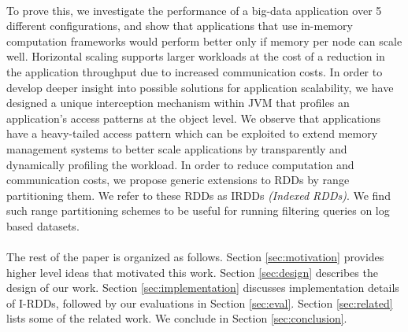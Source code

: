 \paragraph{}
To prove this, we investigate the performance of a big-data application
over 5 different configurations, and show that applications that use
in-memory computation frameworks would perform better only if memory per
node can scale well. Horizontal scaling supports larger workloads at the
cost of a reduction in the application throughput due to increased
communication costs. In order to develop deeper insight into possible
solutions for application scalability, we have designed a unique
interception mechanism within JVM that profiles an application's
access patterns at the object level. We observe that applications have a
heavy-tailed access pattern which can be exploited to extend memory
management systems to better scale applications by transparently and
dynamically profiling the workload.  In order to reduce computation and
communication costs, we propose generic extensions to RDDs by range
partitioning them. We refer to these RDDs as IRDDs \textit{(Indexed
RDDs)}. We find such range partitioning schemes to be useful for running
filtering queries on log based datasets.
\paragraph{}
The rest of the paper is organized as follows. Section
\ref{sec:motivation} provides higher level ideas that motivated this
work. Section \ref{sec:design} describes the design of our work.
Section \ref{sec:implementation} discusses implementation details of
I-RDDs, followed by our evaluations in Section \ref{sec:eval}. Section
\ref{sec:related} lists some of the related work.  We conclude in
Section \ref{sec:conclusion}.
